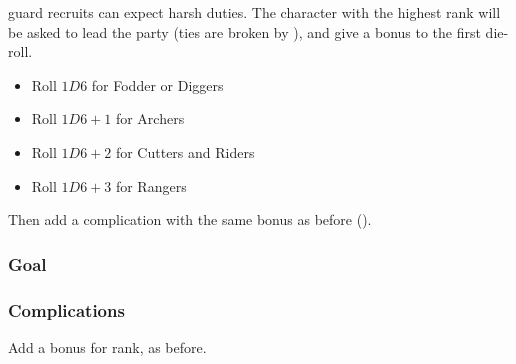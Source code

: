\begin{multicols}{2}

\noindent
\Gls{guard} recruits can expect harsh duties.
The character with the highest rank will be asked to lead the party (ties are broken by ), and give a bonus to the first die-roll.

\begin{itemize}
  \item
  Roll $1D6$ for Fodder or Diggers
  \item
  Roll $1D6+1$ for Archers
  \item
  Roll $1D6+2$ for Cutters and Riders
  \item
  Roll $1D6+3$ for Rangers
\end{itemize}

Then add a complication with the same bonus as before ().

\subsubsection{Goal}

\ngMissions

\subsubsection{Complications}
\label{missionComplications}

Add a bonus for rank, as before.

\missionComplications

\end{multicols}
